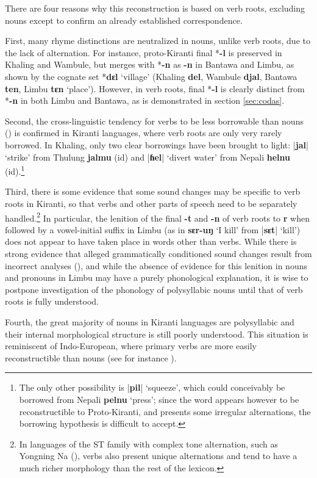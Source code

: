\documentclass[oneside,a4paper,11pt]{article}
\newcommand{\ipa}[1]{\textbf{{\phon\mbox{#1}}}} %
\newcommand{\dhatu}[2]{|\ipa{#1}| `#2'}
\begin{document}
There are four reasons why this reconstruction is based on verb roots, excluding nouns except to confirm an already established correspondence.

First,  many rhyme distinctions are neutralized in nouns, unlike verb roots, due to the lack of alternation. For instance, proto-Kiranti final *\ipa{-l} is preserved in Khaling and Wambule, but merges with *\ipa{-n} as \ipa{-n} in Bantawa and Limbu, as shown by the cognate set *\ipa{dɛl} `village' (Khaling \ipa{del}, Wambule \ipa{djal}, Bantawa \ipa{ten}, Limbu \ipa{tɛn} `place'). However, in verb roots, final *\ipa{-l} is clearly distinct from *\ipa{-n} in both Limbu and Bantawa, as is demonstrated in section \ref{sec:codas}.

Second, the cross-linguistic tendency for verbs to be less borrowable than nouns (\citealt{wohlgemuth09verbal}) is confirmed in Kiranti languages, where verb roots are only very rarely borrowed. In Khaling, only two clear borrowings have been brought to light: \dhatu{jal}{strike} from Thulung \ipa{jalmu}  (id) and \dhatu{ɦel}{divert water} from Nepali \ipa{helnu} (id).\footnote{The only other possibility is  \dhatu{pil}{squeeze}, which could conceivably be borrowed from Nepali \ipa{pelnu} `press'; since the word appears however to be reconstructible to Proto-Kiranti, and presents some irregular alternations, the borrowing hypothesis is difficult to accept.} 

Third, there is some evidence that some sound changes may be specific to verb roots in Kiranti, so that verbs and other parts of speech need to be separately handled.\footnote{In languages of the ST family with complex tone alternation, such as Yongning Na (\citealt{michaud08na}), verbs also present unique alternations and tend to have a much richer morphology than the rest of the lexicon.} In particular, the lenition of the final \ipa{-t} and \ipa{-n} of verb roots to \ipa{r} when followed by a vowel-initial suffix in Limbu (as in \ipa{sɛr-uŋ}  `I kill' from \dhatu{sɛt}{kill}) does not appear to have taken place in words other than verbs. While there is strong evidence that alleged grammatically conditioned sound changes result from incorrect analyses (\citealt{hill14conditioned}), and while the absence of evidence for this lenition in nouns and pronouns in Limbu may have a purely phonological explanation, it is wise to postpone investigation of the phonology of polysyllabic nouns until that of verb roots is fully understood.

Fourth, the great majority of nouns in Kiranti languages are polysyllabic and their internal morphological structure is still poorly understood. This situation is reminiscent of Indo-European, where primary verbs are more easily reconstructible than nouns (see for instance \citealt{garnier10vocalisme}).
\end{document}
